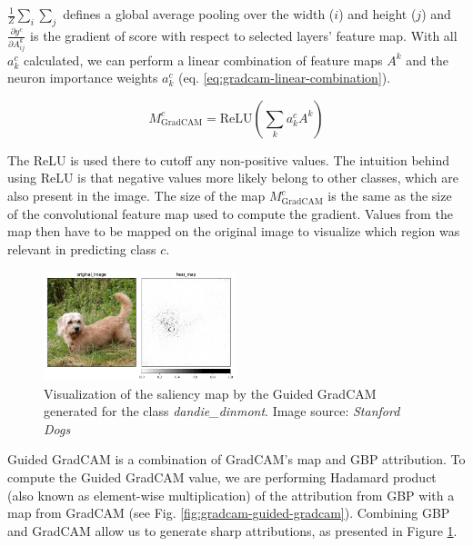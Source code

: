 $\frac{1}{Z} \sum_{i} \sum_{j}$ defines a global average pooling over the width ($i$) and height ($j$) and $\frac{\partial y^c}{\partial A_{ij}^k}$ is the gradient of score with respect to selected layers' feature map. With all $a_k^c$ calculated, we can perform a linear combination of feature maps $A^k$ and the neuron importance weights $a_k^c$ (eq. \ref{eq:gradcam-linear-combination}).

\begin{equation}
    M^c_{\text{GradCAM}} = \text{ReLU} \left(\sum_{k} a_k^c A^k \right)
    \label{eq:gradcam-linear-combination}
\end{equation}

The ReLU is used there to cutoff any non-positive values. The intuition behind using ReLU is that negative values more likely belong to other classes, which are also present in the image. The size of the map $M^c_{\text{GradCAM}}$ is the same as the size of the convolutional feature map used to compute the gradient. Values from the map then have to be mapped on the original image to visualize which region was relevant in predicting class $c$.

\begin{figure}
  \includegraphics[width=0.50\textwidth]{methods/images/501-Dandie_Dinmont-Dandie_Dinmont.png}
  \caption{Visualization of the saliency map by the Guided GradCAM generated for the class \textit{dandie\_dinmont}. Image source: \textit{Stanford Dogs} \cite{stanford-dogs}}\label{fig:gradcam-dandie}
\end{figure}

\vspace{\baselineskip}

Guided GradCAM is a combination of GradCAM's map and GBP attribution. To compute the Guided GradCAM value, we are performing Hadamard product (also known as element-wise multiplication) of the attribution from GBP with a map from GradCAM (see Fig. \ref{fig:gradcam-guided-gradcam}). Combining GBP and GradCAM allow us to generate sharp attributions, as presented in Figure \ref{fig:gradcam-dandie}.